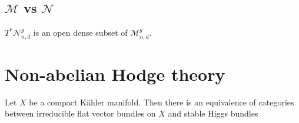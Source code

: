 \documentclass{article}
\begin{document}
\subsection{$\mathcal M$ vs $\mathcal N$}

\begin{proposition}
  $T^*\mathcal N^g_{n,d}$ is an open dense subset of $\mathcal M^g_{n,d}$.
\end{proposition}

\section{Non-abelian Hodge theory}

\begin{theorem}
  Let $X$ be a compact K\"ahler manifold. Then there is an equivalence
  of categories between irreducible flat vector bundles on $X$
  and stable Higgs bundles
\end{theorem}

\printbibliography
\end{document}
